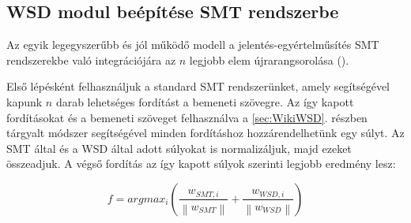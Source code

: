 \subsection{WSD modul beépítése SMT rendszerbe} \label{sec:WSDinSMT}

Az egyik legegyszerűbb és jól működő modell a jelentés-egyértelműsítés SMT rendszerekbe való integrációjára az $n$ legjobb elem újrarangsorolása (\cite{apidianaki2012wsd}).

Első lépésként felhasználjuk a standard SMT rendszerünket, amely segítségével kapunk $n$ darab lehetséges fordítást a bemeneti szövegre. Az így kapott fordításokat és a bemeneti szöveget felhasználva a \ref{sec:WikiWSD}. részben tárgyalt módszer segítségével minden fordításhoz hozzárendelhetünk egy súlyt. Az SMT által és a WSD által adott súlyokat is normalizáljuk, majd ezeket összeadjuk. A végső fordítás az így kapott súlyok szerinti legjobb eredmény lesz:

\begin{equation}
	f = argmax_i (\frac{w_{SMT, i}}{\left\lVert w_{SMT} \right\rVert} + \frac{w_{WSD, i}}{\left\lVert w_{WSD} \right\rVert})
\end{equation}